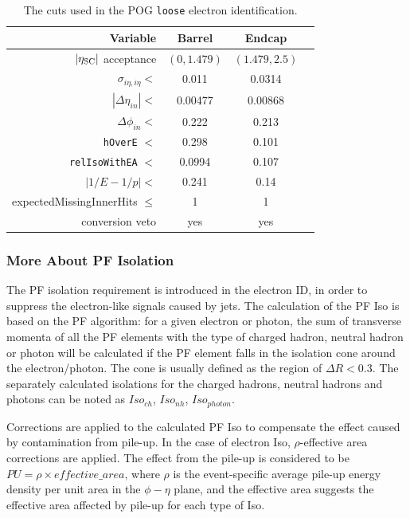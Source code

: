 \begin{table}[htb!]
  \center
  \caption{The cuts used in the POG \texttt{loose} electron identification.}
  \label{tab:electron-id}
  \begin{tabular}{r c c c}
    \hline
    Variable & Barrel & Endcap \\
    \hline
    $|\eta_{\rm SC}|$ acceptance & $(0, 1.479)$ & $(1.479, 2.5)$\\
    $\sigma_{i\eta,i\eta} <$ & 0.011  & 0.0314 \\
    $|\Delta\eta_{in}| <$ & 0.00477  & 0.00868 \\
    $\Delta\phi_{in} <$ & 0.222  & 0.213 \\
    \texttt{hOverE} $<$ & 0.298  & 0.101 \\
    \texttt{relIsoWithEA} $<$ & 0.0994  & 0.107 \\
    $|1/E - 1/p| <$ & 0.241  & 0.14 \\
    expectedMissingInnerHits $\leq$ & 1  & 1 \\
    conversion veto & yes  & yes \\
    \hline
  \end{tabular}
\end{table}

\subsubsection{More About PF Isolation}
The PF isolation requirement is introduced in the electron ID, in order to suppress the electron-like signals caused by jets. The calculation of the PF Iso is based on the PF algorithm: for a given electron or photon, the sum of transverse momenta of all the PF elements with the type of charged hadron, neutral hadron or photon will be calculated if the PF element falls in the isolation cone around the electron/photon. The cone is usually defined as the region of $\Delta R<0.3$. The separately calculated isolations for the charged hadrons, neutral hadrons and photons can be noted as $Iso_{ch}$, $Iso_{nh}$, $Iso_{photon}$.

\vspace{0.3cm}
Corrections are applied to the calculated PF Iso to compensate the effect caused by contamination from pile-up. In the case of electron Iso, $\rho$-effective area corrections are applied. The effect from the pile-up is considered to be $PU= \rho \times effective\_{area}$, where $\rho$ is the event-specific average pile-up energy density per unit area in the $\phi-\eta$ plane, and the effective area suggests the effective area affected by pile-up for each type of Iso. 

